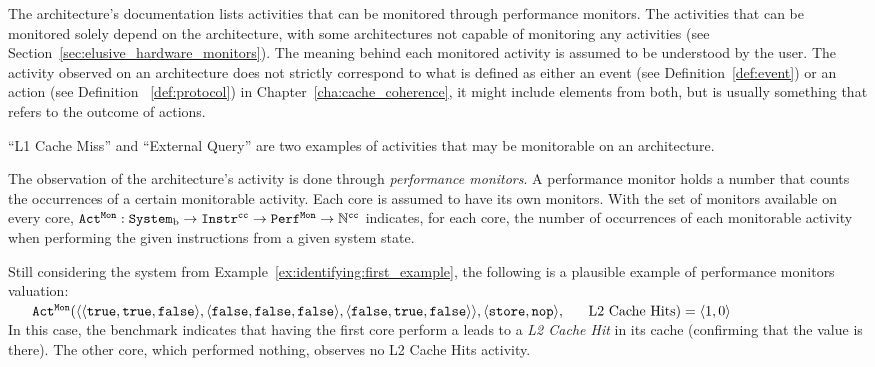 \begin{definition}
\label{def:identifying:observable_event}
The architecture's documentation lists activities that can be monitored through
performance monitors. The activities that can be monitored solely depend on the
architecture, with some architectures not capable of monitoring any activities
(see Section~\ref{sec:elusive_hardware_monitors}).  The meaning behind each
monitored activity is assumed to be understood by the user. The activity
observed on an architecture does not strictly correspond to what is defined as
either an event (see Definition~\ref{def:event}) or an action (see Definition
~\ref{def:protocol}) in Chapter~\ref{cha:cache_coherence}, it might include
elements from both, but is usually something that refers to the outcome of
actions.
\end{definition}
\begin{example}
``L1 Cache Miss'' and ``External Query'' are two examples of activities that
may be monitorable on an architecture.
\end{example}

\begin{definition}
\label{def:identifying:performance_monitor}
   The observation of the architecture's activity is done through
   \emph{performance monitors}. A performance monitor holds a number that counts
   the occurrences of a certain monitorable activity. Each core is assumed to
   have its own monitors.  With \archmonitor{} the set of monitors available on
   every core, $\text{\texttt{Act\textsuperscript{Mon}}}{}: \text{\texttt{System}\textsubscript{b}}{} \to \text{\texttt{Instr}}{}^{\text{\texttt{cc}}}{}{} \to
   \text{\texttt{Perf\textsuperscript{Mon}}}{} \to \mathbb{N}^{\text{\texttt{cc}}}{}$ indicates, for each core, the
   number of occurrences of each monitorable activity when performing the given
   instructions from a given system state.
\end{definition}
\begin{example}
Still considering the system from Example~\ref{ex:identifying:first_example},
the following is a plausible example of performance monitors valuation:\\
$~~\quad\text{\texttt{Act\textsuperscript{Mon}}}{}(
\langle
   \langle \texttt{true}, \texttt{true}, \texttt{false}\rangle,
   \langle \texttt{false}, \texttt{false}, \texttt{false}\rangle,
   \langle \texttt{false}, \texttt{true}, \texttt{false}\rangle
\rangle,
\langle \text{\texttt{store}}{}, \text{\texttt{nop}}{} \rangle,\\
~~\quad
\text{L2 Cache Hits}) = \langle 1, 0
\rangle$\\
In this case, the benchmark indicates that having the first core perform a
\storeinstr{} leads to a \textit{L2 Cache Hit} in its cache (confirming that the
value is there). The other core, which performed nothing, observes no
L2 Cache Hits activity.
\end{example}

